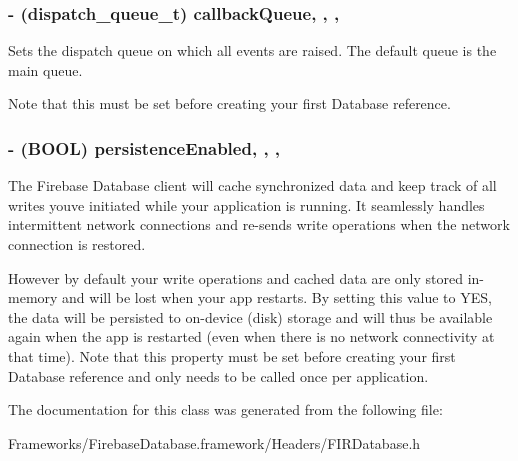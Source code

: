 \subsubsection[{callback\+Queue}]{\setlength{\rightskip}{0pt plus 5cm}-\/ (dispatch\+\_\+queue\+\_\+t) callback\+Queue\hspace{0.3cm}{\ttfamily [read]}, {\ttfamily [write]}, {\ttfamily [nonatomic]}, {\ttfamily [strong]}}\label{interface_f_i_r_database_ae9d35e369f0b50f6a0d890dba953f9d3}
Sets the dispatch queue on which all events are raised. The default queue is the main queue.

Note that this must be set before creating your first Database reference. \hypertarget{interface_f_i_r_database_af82d07aa667557f4e926f05612130bb2}{}
\subsubsection[{persistence\+Enabled}]{\setlength{\rightskip}{0pt plus 5cm}-\/ (B\+O\+O\+L) persistence\+Enabled\hspace{0.3cm}{\ttfamily [read]}, {\ttfamily [write]}, {\ttfamily [nonatomic]}, {\ttfamily [assign]}}\label{interface_f_i_r_database_af82d07aa667557f4e926f05612130bb2}
The Firebase Database client will cache synchronized data and keep track of all writes you\textquotesingle{}ve initiated while your application is running. It seamlessly handles intermittent network connections and re-\/sends write operations when the network connection is restored.

However by default your write operations and cached data are only stored in-\/memory and will be lost when your app restarts. By setting this value to {\ttfamily Y\+E\+S}, the data will be persisted to on-\/device (disk) storage and will thus be available again when the app is restarted (even when there is no network connectivity at that time). Note that this property must be set before creating your first Database reference and only needs to be called once per application. 

The documentation for this class was generated from the following file\+:\begin{DoxyCompactItemize}
\item 
Frameworks/\+Firebase\+Database.\+framework/\+Headers/F\+I\+R\+Database.\+h\end{DoxyCompactItemize}
